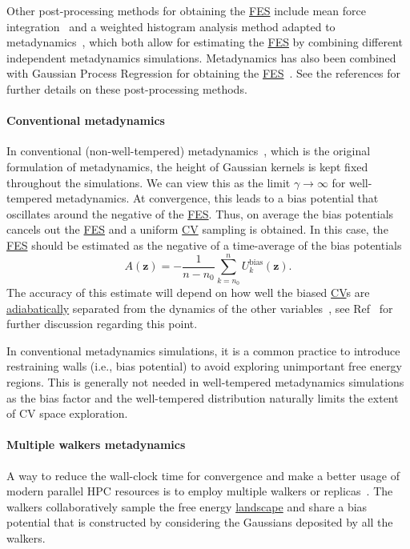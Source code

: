 \documentclass[9pt,review]{livecoms}
\newcommand{\vz}{\mathbf{z}}
\begin{document}
Other post-processing methods for obtaining the \hyperlink{ref:FES} {FES} include mean force integration~\cite{10.1063/1.5123498} and a weighted histogram analysis method adapted to metadynamics~\cite{10.1016/j.cplett.2020.137384}, which both allow for estimating the \hyperlink{ref:FES} {FES} by combining different independent metadynamics simulations.  Metadynamics has also been combined with Gaussian Process Regression for obtaining the \hyperlink{ref:FES} {FES}~\cite{Mones2016}. See the references for further details on these post-processing methods.


\paragraph{Conventional metadynamics}
\label{sec:meta-classic}
In conventional (non-well-tempered) metadynamics~\cite{Laio-PNAS-2002}, which is the original formulation of metadynamics, the height of Gaussian kernels is kept fixed throughout the simulations. We can view this as the limit $
\gamma \to \infty$ for well-tempered metadynamics. At convergence, this leads to a bias potential that oscillates around the negative of the \hyperlink{ref:FES} {FES}. Thus, on average the bias potentials cancels out the \hyperlink{ref:FES} {FES} and a uniform \hyperlink{ref:CV} {CV} sampling is obtained. In this case, the \hyperlink{ref:FES} {FES} should be estimated as the negative of a time-average of the bias potentials~\cite{BussiLaio_ReviewMetaD_2020}
\begin{equation}
A(\vz) = - \frac{1}{n-n_0} \sum^{n}_{k=n_0} U^{\mathrm{bias}}_k(\vz).
\end{equation}
The accuracy of this estimate will depend on how well the biased \hyperlink{ref:CV} {CV}s are \hyperlink{ref:AdiabaticDyn} {adiabatically} separated from the dynamics of the other variables~\cite{laio-gervasio-08,jourdain-lelievre-zitt-21}, see Ref~\cite{BussiLaio_ReviewMetaD_2020} for further discussion regarding this point.

In conventional metadynamics simulations, it is a common practice to introduce restraining walls (i.e., bias potential) to avoid exploring unimportant free energy regions. This is generally not needed in well-tempered metadynamics simulations as the bias factor and the well-tempered distribution naturally limits the extent of CV space exploration.

\paragraph{Multiple walkers metadynamics}
\label{sec:mwmeta}
A way to reduce the wall-clock time for convergence and make a better usage of modern parallel HPC resources is to employ multiple walkers or replicas~\cite{Raiteri-JPCB-2006}. The walkers collaboratively sample the free energy \hyperlink{ref:FES} {landscape} and share a bias potential that is constructed by considering the Gaussians deposited by all the walkers.
\end{document}
